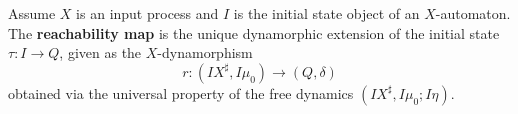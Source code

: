 Assume $X$ is an input process and $I$ is the initial state object of an $X$-automaton. The \textbf{reachability map} is the unique dynamorphic extension of the initial state $\tau: I \to Q$, given as the $X$-dynamorphism
$$r: (IX^{\sharp}, I\mu_0) \longrightarrow (Q, \delta)$$
obtained via the universal property of the free dynamics $(IX^{\sharp}, I\mu_0; I\eta)$.
